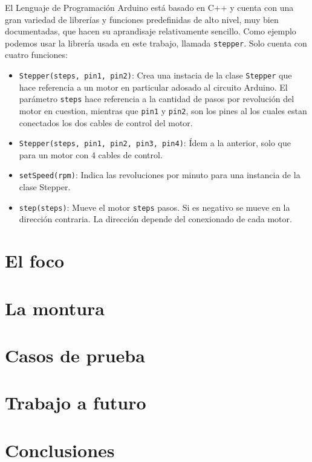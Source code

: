 \documentclass[final,narroweqnarray,inline,twoside]{ieee}
\begin{document}
El Lenguaje de Programación Arduino está basado en C++ y cuenta con una gran variedad de librerías y funciones predefinidas
de alto nivel, muy bien documentadas, que hacen su aprandisaje relativamente sencillo. Como ejemplo podemos usar la librería
usada en este trabajo, llamada \texttt{stepper}. Solo cuenta con cuatro funciones:
\begin{itemize}
 \item \texttt{Stepper(steps, pin1, pin2)}: Crea una instacia de la clase \texttt{Stepper} que hace referencia a un motor en
particular adosado al circuito Arduino. El parámetro \texttt{steps} hace referencia a la cantidad de pasos por revolución
del motor en cuestion, mientras que \texttt{pin1} y \texttt{pin2}, son los pines al los cuales estan conectados los dos
cables de control del motor.
 \item \texttt{Stepper(steps, pin1, pin2, pin3, pin4)}: Ídem a la anterior, solo que para un motor con 4 cables de control.
 \item \texttt{setSpeed(rpm)}: Indica las revoluciones por minuto para una instancia de la clase Stepper.
 \item \texttt{step(steps)}: Mueve el motor \texttt{steps} pasos. Si es negativo se mueve en la dirección contraria. La
dirección depende del conexionado de cada motor.
\end{itemize}



\section{El foco}
\section{La montura}
\section{Casos de prueba}
\section{Trabajo a futuro}
\section{Conclusiones}
\end{document}

